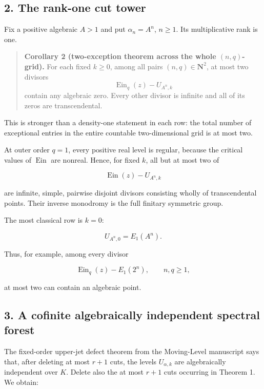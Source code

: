 \documentclass[11pt]{article}
\theoremstyle{keio}
\theoremstyle{definition}
\theoremstyle{remark}
\begin{document}
\subsection{2. The rank-one cut tower}

Fix a positive algebraic \(A>1\) and put \(\alpha_n=A^n\), \(n\geq1\).
Its multiplicative rank is one.

\begin{quote}
\textbf{Corollary 2 (two-exception theorem across the whole \((n,q)\)-grid).}
For each fixed \(k\geq0\), among all pairs \((n,q)\in\mathbf N^2\), at
most two divisors
\[
 \operatorname{Ein}_q(z)-U_{A^n,k}
\]
contain any algebraic zero. Every other divisor is infinite and all of
its zeros are transcendental.
\end{quote}

This is stronger than a density-one statement in each row: the total number
of exceptional entries in the entire countable two-dimensional grid is at
most two.

At outer order \(q=1\), every positive real level is regular, because the
critical values of \(\operatorname{Ein}\) are nonreal. Hence, for fixed
\(k\), all but at most two of

\[
 \operatorname{Ein}(z)-U_{A^n,k}
\]

are infinite, simple, pairwise disjoint divisors consisting wholly of
transcendental points. Their inverse monodromy is the full finitary
symmetric group.

The most classical row is \(k=0\):

\[
 U_{A^n,0}=E_1(A^n).
\]

Thus, for example, among every divisor

\[
 \operatorname{Ein}_q(z)-E_1(2^n),
 \qquad n,q\geq1,
\]

at most two can contain an algebraic point.

\subsection{3. A cofinite algebraically independent spectral forest}

The fixed-order upper-jet defect theorem from the Moving-Level manuscript
says that, after deleting at most \(r+1\) cuts, the levels
\(U_{\alpha,k}\) are algebraically independent over \(K\). Delete also the
at most \(r+1\) cuts occurring in Theorem 1. We obtain:
\end{document}
